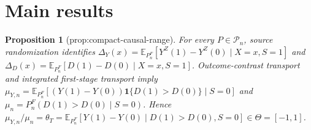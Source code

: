 \documentclass{article}
\newtheorem{proposition}{Proposition}
\begin{document}
\section{Main results}

\begin{proposition}[prop:compact-causal-range]\label{prop:compact-causal-range}
For every \(P\in\mathcal P_n\), source randomization identifies \(\Delta_Y(x)=\mathbb E_{P_n^F}[Y^Z(1)-Y^Z(0)\mid X=x,S=1]\) and \(\Delta_D(x)=\mathbb E_{P_n^F}[D(1)-D(0)\mid X=x,S=1]\). Outcome-contrast transport and integrated first-stage transport imply \(\mu_{Y,n}=\mathbb E_{P_n^F}[(Y(1)-Y(0))\mathbf 1\{D(1)>D(0)\}\mid S=0]\) and \(\mu_n=P_n^F(D(1)>D(0)\mid S=0)\). Hence \(\mu_{Y,n}/\mu_n=\theta_T=\mathbb E_{P_n^F}[Y(1)-Y(0)\mid D(1)>D(0),S=0]\in\Theta=[-1,1]\).
\end{proposition}
\end{document}
